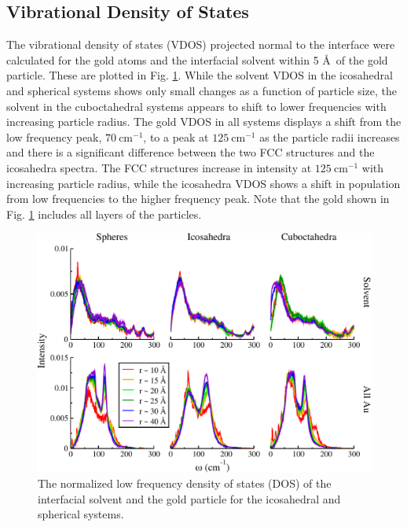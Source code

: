 \documentclass[journal = jpccck, manuscript = suppinfo]{achemso}
\begin{document}
 
\subsection{Vibrational Density of States}

The vibrational density of states (VDOS) projected normal to the
interface were calculated for the gold atoms and the interfacial
solvent within 5 \AA\ of the gold particle.  These are plotted in
Fig. \ref{fig:all-spect}.  While the solvent VDOS in the icosahedral
and spherical systems shows only small changes as a function of
particle size, the solvent in the cuboctahedral systems appears to
shift to lower frequencies with increasing particle radius.  The gold
VDOS in all systems displays a shift from the low frequency peak,
$70 \mathrm{~cm}^{-1}$, to a peak at $125 \mathrm{~cm}^{-1}$ as the
particle radii increases and there is a significant difference between
the two FCC structures and the icosahedra spectra.  The FCC structures
increase in intensity at $125 \mathrm{~cm}^{-1}$ with increasing
particle radius, while the icosahedra VDOS shows a shift in population
from low frequencies to the higher frequency peak.  Note that the gold
shown in Fig. \ref{fig:all-spect} includes all layers of the
particles.

\begin{figure}[!htb]
	\includegraphics[width=5in]{figures/all-spect.pdf}
	\caption{The normalized low frequency density of states (DOS)
          of the interfacial solvent and the gold particle for the
          icosahedral and spherical systems. }
	\label{fig:all-spect}
\end{figure}
\end{document}
